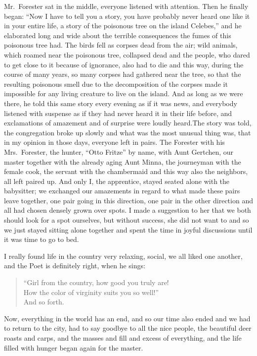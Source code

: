 \documentclass{article}
\begin{document}
Mr.~Forester sat in the middle, everyone listened with attention. Then he finally began: ``Now I have to tell you a story, you have probably never heard one like it in your entire life, a story of the poisonous tree on the island Celebes,'' and he elaborated long and wide about the terrible consequences the fumes of this poisonous tree had. The birds fell as corpses dead from the air; wild animals, which roamed near the poisonous tree, collapsed dead and the people, who dared to get close to it because of ignorance, also had to die and this way, during the course of many years, so many corpses had gathered near the tree, so that the resulting poisonous smell due to the decomposition of the corpses made it impossible for any living creature to live on the island. And as long as we were there, he told this same story every evening as if it was news, and everybody listened with suspense as if they had never heard it in their life before, and exclamations of amazement and of surprise were loudly heard.The story was told, the congregation broke up slowly and what was the most unusual thing was, that in my opinion in those days, everyone left in pairs. The Forester with his Mrs.~Forester, the hunter, ``Otto Fritze'' by name, with Aunt Gertchen, our master together with the already aging Aunt Minna, the journeyman with the female cook, the servant with the chambermaid and this way also the neighbors, all left paired up. And only I, the apprentice, stayed seated alone with the babysitter; we exchanged our amazements in regard to what made these pairs leave together, one pair going in this direction, one pair in the other direction and all had chosen densely grown over spots. I made a suggestion to her that we both should look for a spot ourselves, but without success, she did not want to and so we just stayed sitting alone together and spent the time in joyful discussions until it was time to go to bed.

I really found life in the country very relaxing, social, we all liked one another, and the Poet is definitely right, when he sings:

\begin{quote}
``Girl from the country, how good you truly are!\\
How the color of virginity suits you so well!''\\
And so forth.
\end{quote}

Now, everything in the world has an end, and so our time also ended and we had to return to the city, had to say goodbye to all the nice people, the beautiful deer roasts and carps, and the masses and fill and excess of everything, and the life filled with hunger began again for the master.
\end{document}
